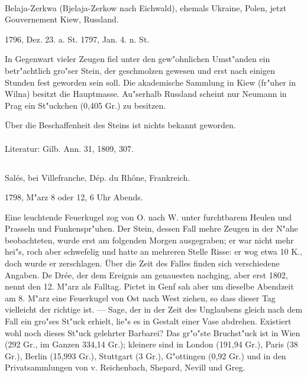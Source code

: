 \documentclass[a4paper, 11pt, oneside]{article}
\begin{document}
\paragraph{}
Belaja-Zerkwa (Bjelaja-Zerkow nach Eichwald), ehemals Ukraine, Polen, jetzt Gouvernement Kiew, Russland.

1796, Dez. 23. a. St. 1797, Jan. 4. n. St.

In Gegenwart vieler Zeugen fiel unter den gew"ohnlichen Umst"anden ein betr"achtlich gro"ser Stein, der geschmolzen gewesen und erst nach einigen Stunden fest geworden sein soll. Die akademische Sammlung in Kiew (fr"uher in Wilna) besitzt die Hauptmasse. Au"serhalb Russland scheint nur Neumann in Prag ein St"uckchen (0,405 Gr.) zu besitzen.

Über die Beschaffenheit des Steins ist nichts bekannt geworden.

\normalsize
\paragraph{}
Literatur: Gilb. Ann. 31, 1809, 307.
\subsection{}
\LARGE
\paragraph{}
Salés, bei Villefranche, Dép. du Rhône, Frankreich.

1798, M"arz 8 oder 12, 6 Uhr Abends.

Eine leuchtende Feuerkugel zog von O. nach W. unter furchtbarem Heulen und Prasseln und Funkenspr"uhen. Der Stein, dessen Fall mehre Zeugen in der N"ahe beobachteten, wurde erst am folgenden Morgen ausgegraben; er war nicht mehr hei"s, roch aber schwefelig und hatte an mehreren Stelle Risse: er wog etwa 10 K., doch wurde er zerschlagen. Über die Zeit des Falles finden sich verschiedene Angaben. De Drée, der dem Ereignis am genauesten nachging, aber erst 1802, nennt den 12. M"arz als Falltag. Pictet in Genf sah aber um dieselbe Abendzeit am 8. M"arz eine Feuerkugel von Ost nach West ziehen, so dass dieser Tag vielleicht der richtige ist. --- Sage, der in der Zeit des Unglaubens gleich nach dem Fall ein gro"ses St"uck erhielt, lie"s es in Gestalt einer Vase abdrehen. Existiert wohl noch dieses St"uck gelehrter Barbarei? Das gr"o"ste Bruchst"uck ist in Wien (292 Gr., im Ganzen 334,14 Gr.); kleinere sind in London (191,94 Gr.), Paris (38 Gr.), Berlin (15,993 Gr.), Stuttgart (3 Gr.), G"ottingen (0,92 Gr.) und in den Privatsammlungen von v. Reichenbach, Shepard, Nevill und Greg.
\end{document}
